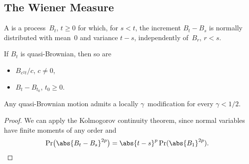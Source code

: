 \subsection	{The Wiener Measure}

\begin	{definition}
A  is a process~$B_t$, \( t \ge 0 \)
for which, for \( s < t \), the increment \( B_t - B_s \)
is normally distributed with mean~$0$ and variance \( t - s \),
independently of~$B_r$, \( r < s \).
\end	{definition}

\begin	{lemma}
If $B_t$ is quasi-Brownian, then so are
\begin	{itemize}
\item	$B_{c^2 t}/c$, \( c \ne 0 \),
\item	\( B_t - B_{t_0} \), \( t_0 \ge 0 \).
\end	{itemize}
\end	{lemma}

\begin	{theorem}
Any quasi-Brownian motion admits a locally $\gamma$\dashHolder\ modification
for every \( \gamma < 1/2 \).
\end	{theorem}
\begin	{proof}
We can apply the Kolmogorov continuity theorem, %
since normal variables have finite moments of any order and \[
	\Pr\bigl( \abs{B_t - B_s}^{2p} \bigr)
	=	\abs{t-s}^p \Pr(\abs{B_1}^{2p})
	\text.
	\qedhere
\]
\end	{proof}
